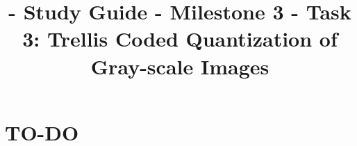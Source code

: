 

\title{\SM{} - Study Guide - Milestone 3 - Task 3: Trellis Coded Quantization of Gray-scale Images}

\maketitle
\tableofcontents

\section{TO-DO}
